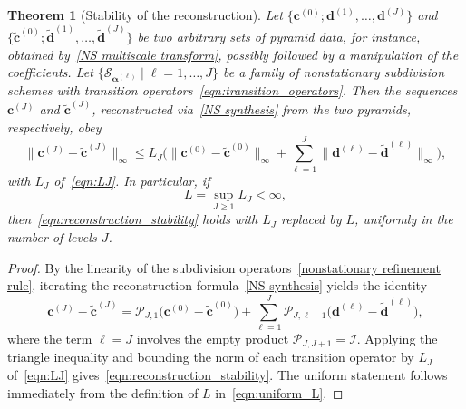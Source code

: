 \documentclass[11pt,a4paper]{article}
\newtheorem{theorem}{Theorem}[section]
\theoremstyle{definition}
\begin{document}
\begin{theorem}[Stability of the reconstruction]
\label{thm. stability of reconstruction}
Let $\{\boldsymbol{c}^{(0)};\boldsymbol{d}^{(1)},\dots,\boldsymbol{d}^{(J)}\}$ and $\{\widetilde{\boldsymbol{c}}^{(0)};\widetilde{\boldsymbol{d}}^{(1)},\dots,\widetilde{\boldsymbol{d}}^{(J)}\}$ be two arbitrary sets of pyramid data, for instance, obtained by~\eqref{NS multiscale transform}, possibly followed by a manipulation of the coefficients. Let $\{\mathcal{S}_{\boldsymbol{\alpha}^{(\ell)}} \mid \ell=1,\dots,J\}$ be a family of nonstationary subdivision schemes with transition operators~\eqref{eqn:transition_operators}. Then the sequences $\boldsymbol{c}^{(J)}$ and $\widetilde{\boldsymbol{c}}^{(J)}$, reconstructed via~\eqref{NS synthesis} from the two pyramids, respectively, obey
\begin{equation}\label{eqn:reconstruction_stability}
    \|\boldsymbol{c}^{(J)}-\widetilde{\boldsymbol{c}}^{(J)}\|_\infty \leq L_J \bigg(\|\boldsymbol{c}^{(0)}-\widetilde{\boldsymbol{c}}^{(0)}\|_\infty+ \sum_{\ell=1}^J \|\boldsymbol{d}^{(\ell)}-\widetilde{\boldsymbol{d}}^{(\ell)}\|_\infty \bigg),
\end{equation}
with $L_J$ of~\eqref{eqn:LJ}. In particular, if
\begin{equation}\label{eqn:uniform_L}
    L=\sup_{J\geq1}L_J<\infty,
\end{equation}
then~\eqref{eqn:reconstruction_stability} holds with $L_J$ replaced by $L$, uniformly in the number of levels $J$.
\end{theorem}

\begin{proof}
    By the linearity of the subdivision operators~\eqref{nonstationary refinement rule}, iterating the reconstruction formula~\eqref{NS synthesis} yields the identity
    \begin{equation*}
        \boldsymbol{c}^{(J)}-\widetilde{\boldsymbol{c}}^{(J)} = \mathcal{P}_{J,1}\big(\boldsymbol{c}^{(0)}-\widetilde{\boldsymbol{c}}^{(0)}\big) + \sum_{\ell=1}^J \mathcal{P}_{J,\ell+1}\big(\boldsymbol{d}^{(\ell)}-\widetilde{\boldsymbol{d}}^{(\ell)}\big),
    \end{equation*}
    where the term $\ell=J$ involves the empty product $\mathcal{P}_{J,J+1}=\mathcal{I}$. Applying the triangle inequality and bounding the norm of each transition operator by $L_J$ of~\eqref{eqn:LJ} gives~\eqref{eqn:reconstruction_stability}. The uniform statement follows immediately from the definition of $L$ in~\eqref{eqn:uniform_L}.
\end{proof}
\end{document}
